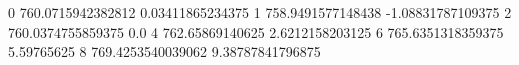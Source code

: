 0 760.0715942382812 0.03411865234375
1 758.9491577148438 -1.08831787109375
2 760.0374755859375 0.0
4 762.65869140625 2.6212158203125
6 765.6351318359375 5.59765625
8 769.4253540039062 9.38787841796875
